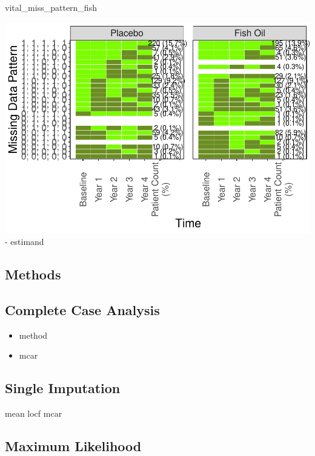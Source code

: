 \documentclass{article}
\newenvironment{Shaded}{\begin{snugshade}}{\end{snugshade}}
\newcommand{\NormalTok}[1]{#1}
\providecommand{\tightlist}{%
  \setlength{\itemsep}{0pt}\setlength{\parskip}{0pt}}
\newcommand{\pandocbounded}[1]{#1}
\begin{document}
\begin{Shaded}
\begin{Highlighting}[]
\NormalTok{vital\_miss\_pattern\_fish}
\end{Highlighting}
\end{Shaded}

\pandocbounded{\includegraphics[keepaspectratio]{Final_Report_files/figure-latex/unnamed-chunk-2-3.pdf}}
- estimand

\subsection{Methods}\label{methods-1}

\subsection{Complete Case Analysis}\label{complete-case-analysis}

\begin{itemize}
\tightlist
\item
  method
\item
  mcar
\end{itemize}

\subsection{Single Imputation}\label{single-imputation}

mean locf mcar

\subsection{Maximum Likelihood}\label{maximum-likelihood}
\end{document}
